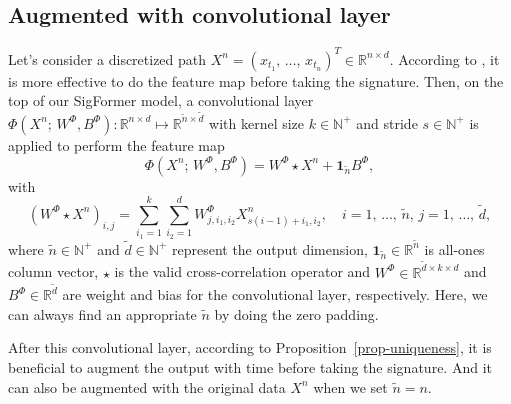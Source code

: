 \documentclass[]{article}
\renewcommand{\(}{\left(}
\renewcommand{\)}{\right)}
\begin{document}
	\subsection{Augmented with convolutional layer}\label{subsec-convolution-layer}
	Let's consider a discretized path $X^n={(x_{t_1},\,\ldots,\,x_{t_n})}^T\in\mathbb{R}^{n\times d}$. According to \cite{Lyons_2019_DeepSignature}, it is more effective to do the feature map before taking the signature. Then, on the top of our SigFormer model, a convolutional layer $\Phi(X^n;\,W^{\Phi},B^{\Phi}):\mathbb{R}^{n\times d}\mapsto\mathbb{R}^{\widetilde{n}\times\widetilde{d}}$ with kernel size $k\in\mathbb{N}^+$ and stride $s\in\mathbb{N}^+$ is applied to perform the feature map
	\begin{equation}
		\label{eq-convolutional-layer}
		\Phi(X^n;\,W^{\Phi},B^{\Phi})=W^{\Phi}\star X^n + \mathbf{1}_{\widetilde{n}}B^{\Phi},
	\end{equation}
	with
	\begin{equation}
		\label{eq-cross-correlation}
		(W^{\Phi}\star X^n)_{i,j}=\sum\limits_{i_1=1}^{k}\sum\limits_{i_2=1}^{d}W^{\Phi}_{j,i_1,i_2}X^n_{s(i-1)+i_1,i_2},\quad i=1,\,\ldots,\,\widetilde{n},\,j=1,\,\ldots,\,\widetilde{d},
	\end{equation}
	where $\widetilde{n}\in\mathbb{N}^+$ and $\widetilde{d}\in\mathbb{N}^+$ represent the output dimension, $\mathbf{1}_{\widetilde{n}}\in\mathbb{R}^{\widetilde{n}}$ is all-ones column vector, $\star$ is the valid cross-correlation operator and $W^{\Phi}\in\mathbb{R}^{\widetilde{d}\times k\times d}$ and $B^{\Phi}\in\mathbb{R}^{\widetilde{d}}$ are weight and bias for the convolutional layer, respectively. Here, we can always find an appropriate $\widetilde{n}$ by doing the zero padding.
	
	After this convolutional layer, according to Proposition~\ref{prop-uniqueness}, it is beneficial to augment the output with time before taking the signature. And it can also be augmented with the original data $X^n$ when we set $\widetilde{n}=n$.
	
\end{document}

